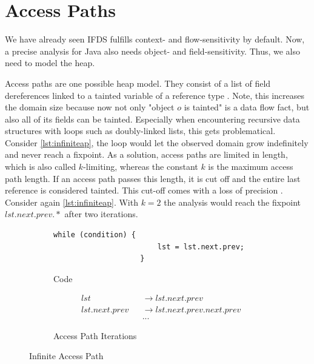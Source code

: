 \documentclass[../draft.tex]{subfiles}
\begin{document}
    \section{Access Paths}\label{s:ap}
    We have already seen IFDS fulfills context- and flow-sensitivity by default.
    Now, a precise analysis for Java also needs object- and field-sensitivity.
    Thus, we also need to model the heap.

    Access paths are one possible heap model.
    They consist of a list of field dereferences linked to a tainted variable of a reference type \cite{Khedker2009}.
    Note, this increases the domain size because now not only "object $o$ is tainted" is a data flow fact, but also all of its fields can be tainted.
    Especially when encountering recursive data structures with loops such as doubly-linked lists, this gets problematical.
    Consider \autoref{lst:infiniteap}, the loop would let the observed domain grow indefinitely and never reach a fixpoint.
    As a solution, access paths are limited in length, which is also called $k$-limiting, whereas the constant $k$ is the maximum access path length.
    If an access path passes this length, it is cut off and the entire last reference is considered tainted.
    This cut-off comes with a loss of precision \cite{Jones1979}.
    Consider again \autoref{lst:infiniteap}.
    With $k=2$ the analysis would reach the fixpoint $lst.next.prev.*$ after two iterations.

    \begin{figure}[ht]
        \centering
        \begin{subfigure}[b]{0.45\textwidth}
            \centering
            \begin{adjustbox}{max width=\columnwidth}
                \begin{lstlisting}[gobble=20]
                    while (condition) {
                        lst = lst.next.prev;
                    }
                \end{lstlisting}
            \end{adjustbox}
            \caption{Code}
        \end{subfigure}
        \qquad
        \begin{subfigure}[b]{0.45\textwidth}
            \centering
            \small
            $$
            \begin{aligned}
                &lst& &\rightarrow lst.next.prev\\
                &lst.next.prev& &\rightarrow lst.next.prev.next.prev\\
                & & &...
            \end{aligned}
            $$
            \normalsize
            \caption{Access Path Iterations}
        \end{subfigure}
        \caption{Infinite Access Path}
        \label{lst:infiniteap}
    \end{figure}
\end{document}
